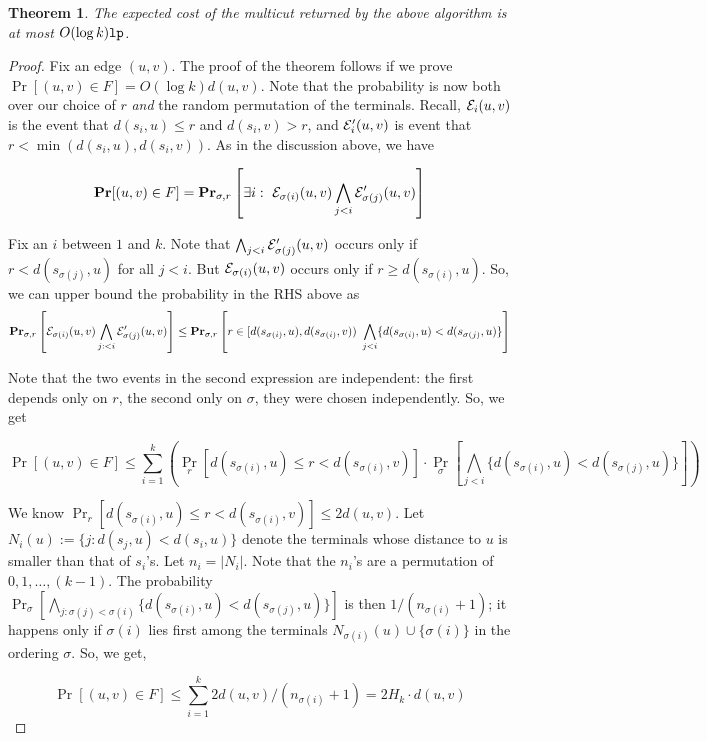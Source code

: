 \documentclass[11pt]{article}
\newtheorem{theorem}{Theorem}
\def\lp{{\tt lp}}
\begin{document}
\begin{theorem}
The expected cost of the multicut returned by the above algorithm is at most $O(\log k)\lp$.
\end{theorem}
\begin{proof}
Fix an edge $(u,v)$. The proof of the theorem follows if we prove $\Pr[(u,v)\in F] = O(\log k)d(u,v)$.
Note that the probability is now both over our choice of $r$ {\em and} the random permutation of 
the terminals. Recall,  ${\mathcal E}_i(u,v)$ is the event that $d(s_i,u) \le r$ and $d(s_i,v) > r$, 
and ${\mathcal E}'_i(u,v)$ is event that $r < \min(d(s_i,u),d(s_i,v))$.
As in the discussion above, we have

\begin{equation}\label{eq:probpermuv}
{\mathbf{Pr}}[(u,v) \in F] = {\mathbf{Pr}}_{\sigma,r} \left[\exists i: ~{\mathcal E}_{\sigma(i)}(u,v)  \bigwedge_{j<i} {\mathcal E}'_{\sigma(j)}(u,v)\right]
\end{equation}

Fix an $i$ between $1$ and $k$. Note that $\bigwedge_{j<i}  {\mathcal E}'_{\sigma(j)}(u,v)$ occurs
only if $r < d(s_{\sigma(j)},u)$ for all $j<i$. But ${\mathcal E}_{\sigma(i)}(u,v)$ occurs only if $r\ge d(s_{\sigma(i)},u)$.
So, we can upper bound the probability in the RHS above as 
$$ {\mathbf{Pr}}_{\sigma,r} \left[{\mathcal E}_{\sigma(i)}(u,v)  \bigwedge_{j:<i} {\mathcal E}'_{\sigma(j)}(u,v)\right]
\le {\mathbf{Pr}}_{\sigma,r}\left[r \in [d(s_{\sigma(i)},u),d(s_{\sigma(i)},v)) ~\bigwedge_{j<i} \{d(s_{\sigma(i)},u) < d(s_{\sigma(j)},u)\} \right]
$$


Note that the two events in the second expression are independent: the first depends only on $r$, the second only 
on $\sigma$, they were chosen independently. So, we get

$$\Pr[(u,v)\in F] \le \sum_{i=1}^k \left(\Pr_{r} \left[d(s_{\sigma(i)},u) \le r < d(s_{\sigma(i)},v)\right]\cdot \Pr_{\sigma}\left[\bigwedge_{j<i} \{d(s_{\sigma(i)},u) < d(s_{\sigma(j)},u)\} \right]\right)$$

We know $\Pr_{r} \left[d(s_{\sigma(i)},u) \le r < d(s_{\sigma(i)},v)\right] \le 2d(u,v)$.
Let $N_i(u) := \{j: d(s_j,u) < d(s_i,u)\}$ denote the terminals whose distance to $u$ is smaller than that of $s_i$'s.
Let $n_i = |N_i|$. Note that the $n_i$'s are a permutation of $0,1,\ldots,(k-1)$. The probability 
$ \Pr_{\sigma}\left[\bigwedge_{j: \sigma(j)<\sigma(i)} \{d(s_{\sigma(i)},u) < d(s_{\sigma(j)},u)\} \right]$ is then $1/(n_{\sigma(i)} + 1)$; it happens only if 
$\sigma(i)$ lies first among the terminals $N_{\sigma(i)}(u) \cup \{\sigma(i)\}$ in the ordering $\sigma$. So, we get,

$$\Pr[(u,v)\in F] \le \sum_{i=1}^k 2d(u,v)/(n_{\sigma(i)}+1) = 2H_k\cdot d(u,v)$$
\end{proof}
\end{document}
